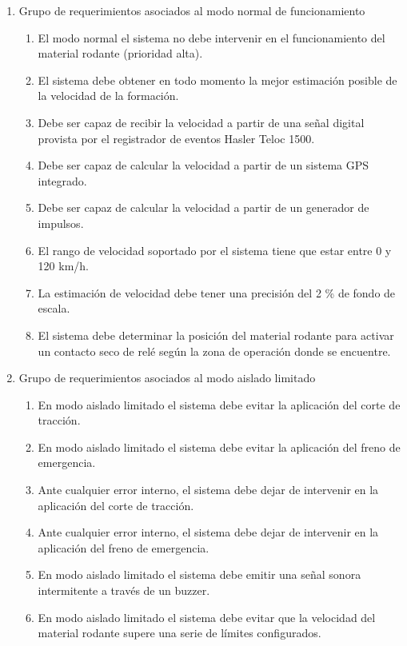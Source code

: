 \begin{enumerate}
    \item Grupo de requerimientos asociados al modo normal de funcionamiento
    \begin{enumerate}
        \item El modo normal el sistema no debe intervenir en el funcionamiento del material rodante (prioridad alta).
        \item El sistema debe obtener en todo momento la mejor estimación posible de la velocidad de la formación.
        \item Debe ser capaz de recibir la velocidad a partir de una señal digital provista por el registrador de eventos Hasler Teloc 1500.
        \item Debe ser capaz de calcular la velocidad a partir de un sistema GPS integrado.
        \item Debe ser capaz de calcular la velocidad a partir de un generador de impulsos.
        \item El rango de velocidad soportado por el sistema tiene que estar entre 0 y 120 km/h.
        \item La estimación de velocidad debe tener una precisión del 2 \% de fondo de escala.
        \item El sistema debe determinar la posición del material rodante para activar un contacto seco de relé según la zona de operación donde se encuentre.
    \end{enumerate}
    \vspace{1cm}
    \item Grupo de requerimientos asociados al modo aislado limitado
    \begin{enumerate}
        \item En modo aislado limitado el sistema debe evitar la aplicación del corte de tracción.
        \item En modo aislado limitado el sistema debe evitar la aplicación del freno de emergencia.
        \item Ante cualquier error interno, el sistema debe dejar de intervenir en la aplicación del corte de tracción.
        \item Ante cualquier error interno, el sistema debe dejar de intervenir en la aplicación del freno de emergencia.
        \item En modo aislado limitado el sistema debe emitir una señal sonora intermitente a través de un buzzer.
        \item En modo aislado limitado el sistema debe evitar que la velocidad del material rodante supere una serie de límites configurados.

\end{enumerate}
\end{enumerate}
